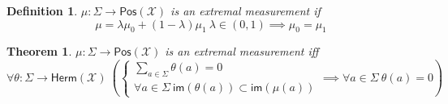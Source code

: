 \documentclass[aps,pra,onecolumn,notitlepage,superscriptaddress]{revtex4-1}
\newcommand{\spc}[1]{\mathcal{#1}}
\newcommand{\Pos}{\mathsf{Pos}}
\newcommand{\Herm}{\mathsf{Herm}}
\newcommand{\im}{\mathsf{im}}
\newtheorem{theo}{Theorem}
\newtheorem{defi}{Definition}
\begin{document}
    \begin{defi}
        $\mu : \Sigma \to \Pos(\spc X)$ is an extremal measurement if 
        \begin{equation}
            \mu = \lambda \mu_0 + (1-\lambda) \mu_1 \ \lambda \in (0,1) \implies \mu_0 = \mu_1
        \end{equation}
    \end{defi}

    \begin{theo}
        $\mu : \Sigma \to \Pos(\spc X)$ is an extremal measurement iff
        \begin{equation}
            \forall \theta : \Sigma \to \Herm(\spc X) \
            \left(
                \begin{cases}
                    \sum_{a \in \Sigma} \theta(a) = 0 \\
                    \forall a \in \Sigma \ \im(\theta(a)) \subset \im(\mu(a))
                \end{cases}
                \implies \forall a \in \Sigma \ \theta(a) = 0
            \right) 
        \end{equation}
    \end{theo}
\end{document}
